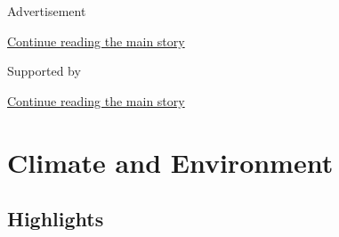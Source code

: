 Advertisement

\protect\hyperlink{after-top}{Continue reading the main story}

Supported by

\protect\hyperlink{after-sponsor}{Continue reading the main story}

\hypertarget{climate-and-environment-1}{%
\section{Climate and Environment}\label{climate-and-environment-1}}

\hypertarget{highlights}{%
\subsection{Highlights}\label{highlights}}

